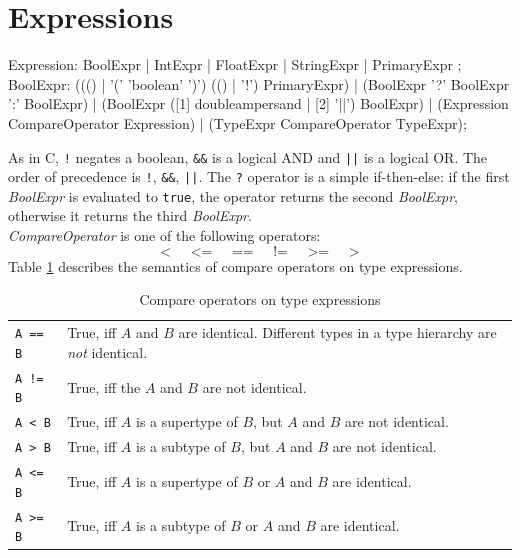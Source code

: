 \section{Expressions}
\label{expressions}
\begin{rail}
  Expression: BoolExpr | IntExpr | FloatExpr | StringExpr | PrimaryExpr ;  
  BoolExpr: ((() | '(' 'boolean' ')') (() | '!') PrimaryExpr) | (BoolExpr '?' BoolExpr ':' BoolExpr) | (BoolExpr ([1] doubleampersand | [2] '||') BoolExpr) | (Expression CompareOperator Expression) | (TypeExpr CompareOperator TypeExpr);
\end{rail}
As in C, \texttt{!} negates a boolean, \texttt{\&\&} is a logical AND and \texttt{||} is a logical OR. The order of precedence is \texttt{!}, \texttt{\&\&}, \texttt{||}. The \texttt{?} operator is a simple if-then-else: if the first \emph{BoolExpr} is evaluated to \texttt{true}, the operator returns the second \emph{BoolExpr}, otherwise it returns the third \emph{BoolExpr}.\\
\emph{CompareOperator} is one of the following operators:
\[ \texttt{<} \;\;\;\;\; \texttt{<=} \;\;\;\;\; \texttt{==} \;\;\;\;\; \texttt{!=} \;\;\;\;\; \texttt{>=} \;\;\;\;\; \texttt{>} \]
Table \ref{compandtypes} describes the semantics of compare operators on type expressions.
\begin{table}[htbp]
\label{compandtypes} 
  \begin{tabularx}{\linewidth}{|l|X|} \hline
    \texttt{A == B} & True, iff $A$ and $B$ are identical. Different types in a type hierarchy are \emph{not} identical. \\
    \texttt{A != B} & True, iff the $A$ and $B$ are not identical. \\
    \texttt{A < B} & True, iff $A$ is a supertype of $B$, but $A$ and $B$ are not identical. \\
    \texttt{A > B} & True, iff $A$ is a subtype of $B$, but $A$ and $B$ are not identical. \\
    \texttt{A <= B} & True, iff $A$ is a supertype of $B$ or $A$ and $B$ are identical. \\
    \texttt{A >= B} & True, iff $A$ is a subtype of $B$ or $A$ and $B$ are identical. \\ \hline
  \end{tabularx}
\caption{Compare operators on type expressions}
\end{table}

